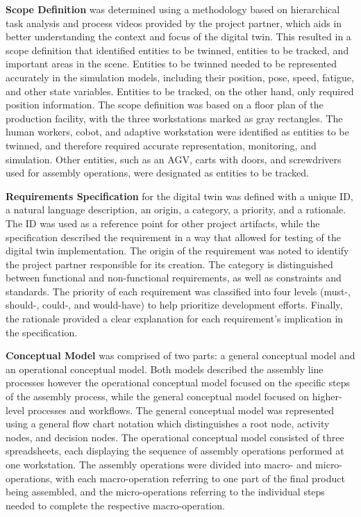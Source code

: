 \documentclass{llncs}
\begin{document}
    \textbf{Scope Definition} was determined using a methodology based on hierarchical task analysis and process videos provided by the project partner, which aids in better understanding the context and focus of the digital twin.
    This resulted in a scope definition that identified entities to be twinned, entities to be tracked, and important areas in the scene. 
    Entities to be twinned needed to be represented accurately in the simulation models, including their position, pose, speed, fatigue, and other state variables. 
    Entities to be tracked, on the other hand, only required position information. The scope definition was based on a floor plan of the production facility, with the three workstations marked as gray rectangles. 
    The human workers, cobot, and adaptive workstation were identified as entities to be twinned, and therefore required accurate representation, 
    monitoring, and simulation. Other entities, such as an AGV, carts with doors, and screwdrivers used for assembly operations, were designated as entities to be tracked.

    \textbf{Requirements Specification} for the digital twin was defined with a unique ID, a natural language description, an origin, a category, a priority, and a rationale. The ID was used as a reference point for other project artifacts, while the specification described the requirement in a way that allowed for testing of the digital twin implementation. The origin of the requirement was noted to identify the project partner responsible for its creation.
     The category is distinguished between functional and non-functional requirements, as well as constraints and standards. The priority of each requirement was classified into four levels 
    (must-, should-, could-, and would-have) to help prioritize development efforts. 
    Finally, the rationale provided a clear explanation for each requirement's implication in the specification.

    \textbf{Conceptual Model} was comprised of two parts: a general conceptual model and an operational conceptual model. 
    Both models described the assembly line processes however the operational conceptual model focused on the specific steps of the assembly process, while the general conceptual model focused on higher-level processes and workflows.
    The general conceptual model was represented using a general flow chart notation which distinguishes a root node, activity nodes, and decision nodes.
    The operational conceptual model consisted of three spreadsheets, each displaying the sequence of assembly operations performed at one workstation. 
    The assembly operations were divided into macro- and micro-operations, with each macro-operation referring 
    to one part of the final product being assembled, and the micro-operations referring to the individual steps needed to complete the respective macro-operation.
\end{document}
